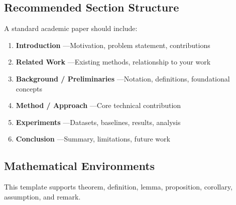 \documentclass[]{fairmeta} %
\theoremstyle{plain}
\theoremstyle{definition}
\theoremstyle{remark}
\begin{document}
\subsection{Recommended Section Structure}
\label{sec:sections}

A standard academic paper should include:

\begin{enumerate}[topsep=6pt, itemsep=4pt]
    \item \textbf{Introduction} ---Motivation, problem statement, contributions
    \item \textbf{Related Work} ---Existing methods, relationship to your work
    \item \textbf{Background / Preliminaries} ---Notation, definitions, foundational concepts
    \item \textbf{Method / Approach} ---Core technical contribution
    \item \textbf{Experiments} ---Datasets, baselines, results, analysis
    \item \textbf{Conclusion} ---Summary, limitations, future work
\end{enumerate}


\subsection{Mathematical Environments}
\label{sec:math}

This template supports theorem, definition, lemma, proposition, corollary, assumption, and remark.
\end{document}
